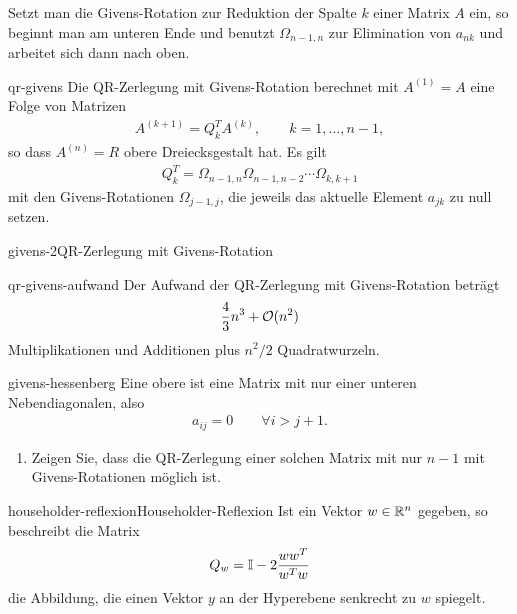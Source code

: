 \begin{remark}
  Setzt man die Givens-Rotation zur Reduktion der Spalte $k$ einer
  Matrix $A$ ein, so beginnt man am unteren Ende und benutzt
  $\Omega_{n-1,n}$ zur Elimination von $a_{nk}$ und arbeitet sich dann nach oben.
\end{remark}

\begin{Lemma}{qr-givens}
  Die QR-Zerlegung mit Givens-Rotation berechnet mit $A^{(1)} = A$ eine Folge von Matrizen
  \begin{gather}
    A^{(k+1)} = Q_k^T A^{(k)}, \qquad k=1,\dots,n-1,
  \end{gather}
  so dass $A^{(n)}=R$ obere Dreiecksgestalt hat. Es gilt
  \begin{gather}
    Q_k^T = \Omega_{n-1,n}\Omega_{n-1,n-2}\cdots\Omega_{k,k+1}
  \end{gather}
  mit den Givens-Rotationen $\Omega_{j-1,j}$, die jeweils das aktuelle
  Element $a_{jk}$ zu null setzen.
\end{Lemma}

\begin{Algorithmus*}{givens-2}{QR-Zerlegung mit Givens-Rotation}
  
\end{Algorithmus*}

\begin{Lemma}{qr-givens-aufwand}
  Der Aufwand der QR-Zerlegung mit Givens-Rotation beträgt
  \begin{gather}
    \frac43 n^3 + \mathcal O(n^2)
  \end{gather}
  Multiplikationen und Additionen plus $n^2/2$ Quadratwurzeln.
\end{Lemma}

\begin{Aufgabe}{givens-hessenberg}
  Eine obere  ist eine Matrix mit nur einer
  unteren Nebendiagonalen, also
  \begin{gather}
    a_{ij} = 0\qquad \forall i>j+1.
  \end{gather}
  \begin{enumerate}
  \item Zeigen Sie, dass die QR-Zerlegung einer solchen Matrix mit nur
    $n-1$ mit Givens-Rotationen möglich ist.
  \end{enumerate}
\end{Aufgabe}

\begin{Definition*}{householder-reflexion}{Householder-Reflexion}
  Ist ein Vektor $w\in \mathbb R^n$ gegeben, so beschreibt die Matrix
  \begin{gather}
    Q_w = \mathbb I - 2\frac{ww^T}{w^Tw}
  \end{gather}
  die Abbildung, die einen Vektor $y$ an der Hyperebene senkrecht zu
  $w$ spiegelt.
\end{Definition*}

